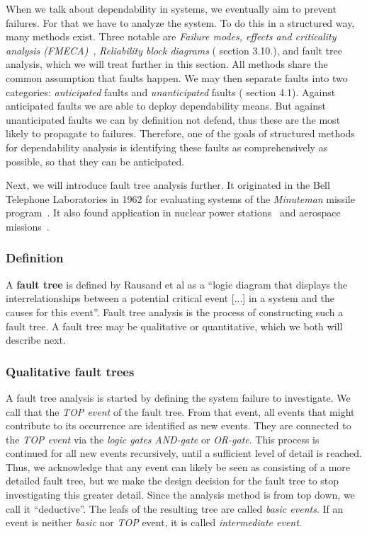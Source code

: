 When we talk about dependability in systems, we eventually aim to prevent failures. For that we have to analyze the system. To do this in a structured way, many methods exist. Three notable are \emph{Failure modes, effects and criticality analysis (FMECA)}~\cite{FMEA}, \emph{Reliability block diagrams} (\cite{SysReliabilityTheory} section 3.10.), and fault tree analysis, which we will treat further in this section. All methods share the common assumption that faults happen. We may then separate faults into two categories: \emph{anticipated} faults and \emph{unanticipated} faults (\cite{SysReliabilityTheory} section 4.1). Against anticipated faults we are able to deploy dependability means. But against unanticipated faults we can by definition not defend, thus these are the most likely to propagate to failures. Therefore, one of the goals of structured methods for dependability analysis is identifying these faults as comprehensively as possible, so that they can be anticipated.

Next, we will introduce fault tree analysis further. It originated in the Bell Telephone Laboratories in 1962 for evaluating systems of the \emph{Minuteman} missile program~\cite{ericson1999fault}. It also found application in nuclear power stations~\cite{NuclearFT} and aerospace missions~\cite{NasaFT}.

\subsubsection{Definition}

A \textbf{fault tree} is defined by Rausand et al \cite{SysReliabilityTheory} as a ``logic diagram that displays the interrelationships between a potential critical event [...] in a system and the causes for this event''. Fault tree analysis is the process of constructing such a fault tree. A fault tree may be qualitative or quantitative, which we both will describe next.

\subsubsection{Qualitative fault trees}

A fault tree analysis is started by defining the system failure to investigate. We call that the \emph{TOP event} of the fault tree. From that event, all events that might contribute to its occurrence are identified as new events. They are connected to the \emph{TOP event} via the \emph{logic gates} \emph{AND-gate} or \emph{OR-gate}. This process is continued for all new events recursively, until a sufficient level of detail is reached. Thus, we acknowledge that any event can likely be seen as consisting of a more detailed fault tree, but we make the design decision for the fault tree to stop investigating this greater detail. Since the analysis method is from top down, we call it ``deductive''. The leafs of the resulting tree are called \emph{basic events}. If an event is neither \emph{basic} nor \emph{TOP} event, it is called \emph{intermediate event}.

